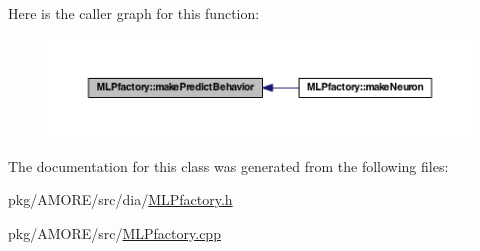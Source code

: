 Here is the caller graph for this function:
\nopagebreak
\begin{figure}[H]
\begin{center}
\leavevmode
\includegraphics[width=400pt]{class_m_l_pfactory_a2734e70d1b260ec88975474d77abf881_icgraph}
\end{center}
\end{figure}




The documentation for this class was generated from the following files:\begin{DoxyCompactItemize}
\item 
pkg/AMORE/src/dia/\hyperlink{_m_l_pfactory_8h}{MLPfactory.h}\item 
pkg/AMORE/src/\hyperlink{_m_l_pfactory_8cpp}{MLPfactory.cpp}\end{DoxyCompactItemize}
